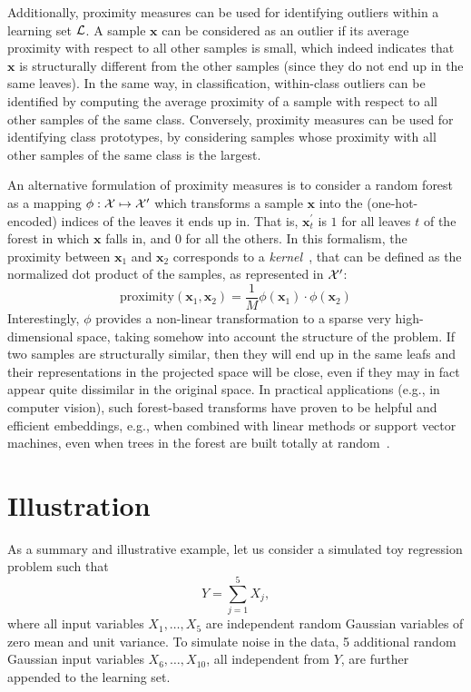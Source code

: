 Additionally, proximity measures can be used for identifying outliers within a
learning set ${\cal L}$. A sample $\mathbf{x}$ can be considered as an outlier
if its average proximity with respect to all other samples is small, which
indeed indicates that $\mathbf{x}$ is structurally different from the other
samples (since they do not end up in the same leaves). In the same way, in
classification, within-class outliers can be identified by computing the
average proximity of a sample with respect to all other samples of the same
class. Conversely, proximity measures can be used for identifying class
prototypes, by considering samples whose proximity with all other samples
of the same class is the largest.

An alternative formulation of proximity measures is to consider a random forest
as a mapping $\phi: {\cal X} \mapsto {\cal X}^\prime$ which transforms a sample
$\mathbf{x}$ into the (one-hot-encoded) indices of the leaves it ends up in.
That is, $\mathbf{x}^\prime_t$ is $1$ for all leaves $t$ of the forest in which
$\mathbf{x}$ falls in, and $0$ for all the others. In this formalism, the
proximity between $\mathbf{x}_1$ and $\mathbf{x}_2$ corresponds to a
\textit{kernel}~\citep{scholkopf:2001}, that can be defined as the normalized
dot product of the samples, as represented in ${\cal X}^\prime$:
\begin{equation}
\text{proximity}(\mathbf{x}_1, \mathbf{x}_2) = \frac{1}{M} \phi(\mathbf{x}_1) \cdot \phi(\mathbf{x}_2)
\end{equation}
Interestingly, $\phi$ provides a non-linear transformation to a sparse very
high-dimensional space, taking somehow into account the structure of the
problem. If two samples are structurally similar, then they will end up in the
same leafs and their representations in the projected space will be close, even
if they may in fact appear quite dissimilar in the original space. In practical
applications (e.g., in computer vision), such forest-based transforms have
proven to be helpful and efficient embeddings, e.g., when combined with linear
methods or support vector machines, even when trees in the forest are built
totally at random~\citep{moosmann:2006,maree:2013}.

\section{Illustration}
\label{sec:4:illustration}

As a summary and illustrative example, let us consider a simulated toy
regression problem such that
\begin{equation}
Y = \sum_{j=1}^{5} X_j,
\end{equation}
where all input variables $X_1,\dots,X_{5}$ are independent
random Gaussian variables of zero mean and unit variance. To simulate
noise in the data, 5 additional random Gaussian input variables $X_{6},\dots,X_{10}$,
all independent from $Y$, are further appended to the learning set.

